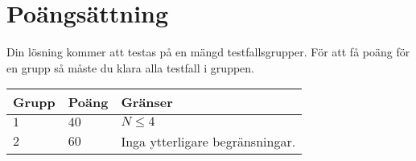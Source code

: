 \section*{Poängsättning}
Din lösning kommer att testas på en mängd testfallsgrupper.
För att få poäng för en grupp så måste du klara alla testfall i gruppen.

\noindent
\begin{tabular}{| l | l | p{12cm} |}
  \hline
  \textbf{Grupp} & \textbf{Poäng} & \textbf{Gränser} \\ \hline
  $1$    & $40$      & $N \leq 4$ \\ \hline
  $2$    & $60$      & Inga ytterligare begränsningar. \\ \hline
\end{tabular}
